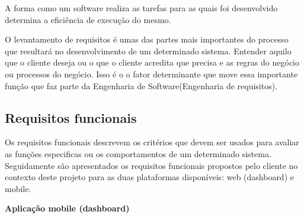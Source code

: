 



A forma como um software realiza as tarefas para as quais foi desenvolvido determina a eficiência de execução do mesmo. 





O levantamento de requisitos é umas das partes mais importantes do processo que resultará no desenvolvimento de um determinado sistema. Entender aquilo que o cliente deseja ou o que o cliente acredita que precisa e as regras do negócio ou processos do negócio. Isso é o o fator determinante que move essa importante função que faz parte da Engenharia de Software(Engenharia de requisitos). 




\subsection{Requisitos funcionais}


Os requisitos funcionais descrevem os critérios que devem ser usados para avaliar as funções especificas ou os comportamentos de um determinado sistema. Seguidamente são apresentados os requisitos funcionais propostos pelo cliente no contexto deste projeto para as duas plataformas disponíveis: web (dashboard) e mobile. 


\textbf{Aplicação mobile (dashboard)}


